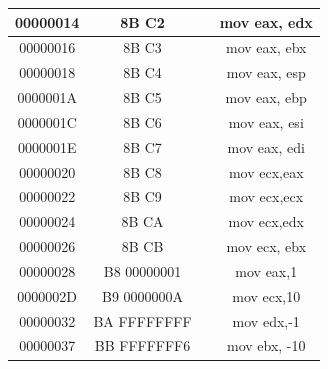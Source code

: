 \documentclass[10pt]{book}
\begin{document}
\begin{center}
\begin{tabular}{|c|c|c|c|}
\hline
00000014 & 8B C2 &  & mov eax, edx \\
\hline
00000016 & 8B C3 &  & mov eax, ebx \\
\hline
00000018 & 8B C4 &  & mov eax, esp \\
\hline
0000001A & 8B C5 &  & mov eax, ebp \\
\hline
0000001C & 8B C6 &  & mov eax, esi \\
\hline
0000001E & 8B C7 &  & mov eax, edi \\
\hline
00000020 & 8B C8 &  & mov ecx,eax \\
\hline
00000022 & 8B C9 &  & mov ecx,ecx \\
\hline
00000024 & 8B CA &  & mov ecx,edx \\
\hline
00000026 & 8B CB &  & mov ecx, ebx \\
\hline
00000028 & B8 00000001 &  & mov eax,1 \\
\hline
0000002D & B9 0000000A &  & mov ecx,10 \\
\hline
00000032 & BA FFFFFFFF &  & mov edx,-1 \\
\hline
00000037 & BB FFFFFFF6 &  & mov ebx, -10 \\
\hline
\end{tabular}
\end{center}
\end{document}
